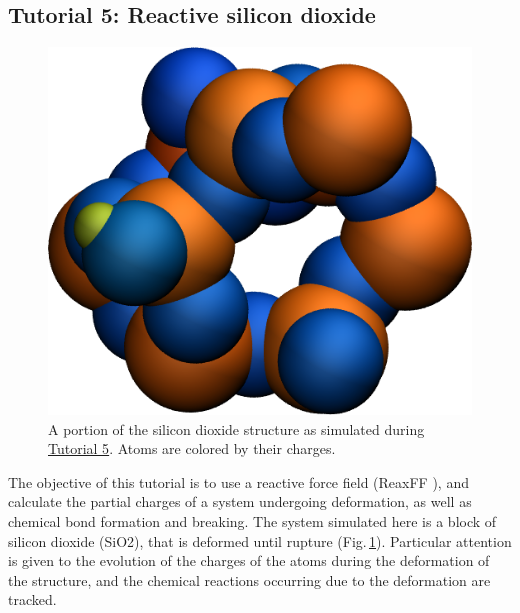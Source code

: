 \documentclass[9pt,tutorial]{livecoms}
\begin{document}
\subsection{Tutorial 5: Reactive silicon dioxide}
\label{reactive-silicon-dioxide-label}

\begin{figure}
\centering
\includegraphics[width=0.55\linewidth]{SIO}
\caption{A portion of the silicon dioxide structure as simulated during \hyperref[reactive-silicon-dioxide-label]{Tutorial 5}. Atoms are colored by their charges.}
\label{fig:SIO}
\end{figure}

\noindent The objective of this tutorial is to use a reactive force field (ReaxFF \cite{van2001reaxff, zou2012investigation}), and calculate the partial charges of a system undergoing deformation, as well as chemical bond formation and breaking. The system simulated here is a block of silicon dioxide (SiO2), that is deformed until rupture (Fig.\,\ref{fig:SIO}). Particular attention is given to the evolution of the charges of the atoms during the deformation of the structure, and the chemical reactions occurring due to the deformation are tracked.
\end{document}
